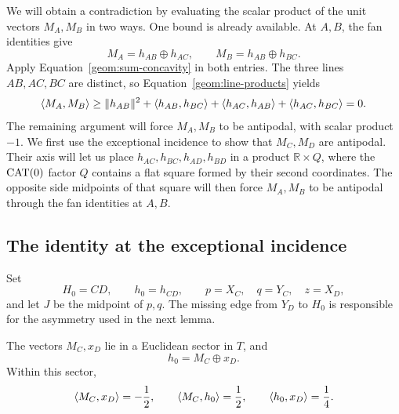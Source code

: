 We will obtain a contradiction by evaluating the scalar product of
the unit vectors $M_A,M_B$ in two ways.  One bound is already
available.  At $A,B$, the fan identities give
\[
 M_A=h_{AB}\oplus h_{AC},\qquad
 M_B=h_{AB}\oplus h_{BC}.
\]
Apply Equation~\eqref{geom:sum-concavity} in both entries.  The three
lines $AB,AC,BC$ are distinct, so
Equation~\eqref{geom:line-products} yields
\begin{equation}
 \langle M_A,M_B\rangle
 \geq\lVert h_{AB}\rVert^2+\langle h_{AB},h_{BC}\rangle
       +\langle h_{AC},h_{AB}\rangle+\langle h_{AC},h_{BC}\rangle
 =0.
 \label{geom:nonnegative}
\end{equation}
The remaining argument will force $M_A,M_B$ to be antipodal, with
scalar product $-1$.  We first use the exceptional incidence to show
that $M_C,M_D$ are antipodal.  Their axis will let us place
$h_{AC},h_{BC},h_{AD},h_{BD}$ in a product $\mathbb R\times Q$,
where the $\operatorname{CAT}(0)$ factor $Q$ contains a flat square formed by
their second coordinates.  The opposite side midpoints of that square
will then force $M_A,M_B$ to be antipodal through the fan identities
at $A,B$.

\subsection{The identity at the exceptional incidence}

Set
\[
 H_0=CD,\qquad h_0=h_{CD},\qquad
 p=X_C,\quad q=Y_C,\quad z=X_D,
\]
and let $J$ be the midpoint of $p,q$.  The missing edge from $Y_D$
to $H_0$ is responsible for the asymmetry used in the next lemma.

\begin{lemma}
\label{geom:exceptional}
The vectors $M_C,x_D$ lie in a Euclidean sector in $T$, and
\begin{equation}
 h_0=M_C\oplus x_D.
 \label{geom:exceptional-sum}
\end{equation}
Within this sector,
\begin{equation}
 \langle M_C,x_D\rangle=-\frac12,\qquad
 \langle M_C,h_0\rangle=\frac12,\qquad
 \langle h_0,x_D\rangle=\frac14.
 \label{geom:exceptional-products}
\end{equation}
\end{lemma}

